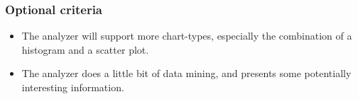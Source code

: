 \subsubsection{Optional criteria}
\begin{itemize}
\item The analyzer will support more chart-types, especially the combination of
a histogram and a scatter plot. 
\item The analyzer does a little bit of data mining, and presents some potentially interesting information.
\end{itemize}






